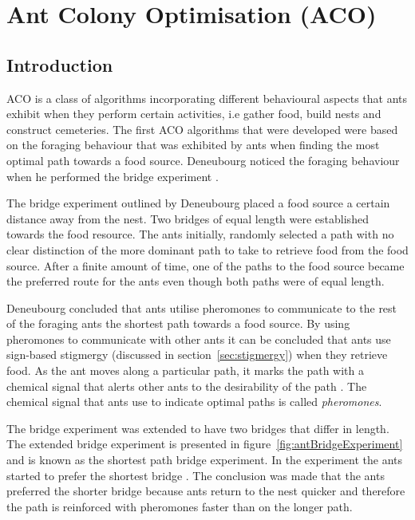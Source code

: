\section{Ant Colony Optimisation (ACO)}
\label{sec:ACO}
\subsection{Introduction}
\label{sec:ACOverview}
ACO is a class of algorithms incorporating different behavioural aspects that ants exhibit when they perform certain activities, i.e gather food, build nests and construct cemeteries\cite{AntsAndStigmergy,CompuIntelligenceIntro}. The first \gls{ACO} algorithms that were developed were based on the foraging behaviour that was exhibited by ants when finding the most optimal path towards a food source. Deneubourg noticed the foraging behaviour when he performed the bridge experiment \cite{AntsAndStigmergy,CompuIntelligenceIntro}.

The bridge experiment outlined by Deneubourg placed a food source a certain distance away from the nest\cite{AntsAndStigmergy,CompuIntelligenceIntro}. Two bridges of equal length were established towards the food resource. The ants initially, randomly selected a path with no clear distinction of the more dominant path to take to retrieve food from the food source\cite{AntsAndStigmergy,CompuIntelligenceIntro}. After a finite amount of time, one of the paths to the food source became the preferred route for the ants even though both paths were of equal length.

Deneubourg concluded that ants utilise pheromones to communicate to the rest of the foraging ants the shortest path towards a food source\cite{FundamentalSwarm}. By using pheromones to communicate with other ants it can be concluded that ants use sign-based stigmergy (discussed in section~\ref{sec:stigmergy}) when they retrieve food\cite{AntIntroTrends,AntsAndStigmergy,CompuIntelligenceIntro}. As the ant moves along a particular path, it marks the path with a chemical signal that alerts other ants to the desirability of the path \cite{CompuIntelligenceIntro}. The chemical signal that ants use to indicate optimal paths is called \emph{pheromones}\cite{AntsAndStigmergy,CompuIntelligenceIntro}.

The bridge experiment was extended to have two bridges that differ in length. The extended bridge experiment is presented in figure~\ref{fig:antBridgeExperiment} and is known as the shortest path bridge experiment\cite{FundamentalSwarm}. In the experiment the ants started to prefer the shortest bridge \cite{FundamentalSwarm}. The conclusion was made that the ants preferred the shorter bridge because ants return to the nest quicker and therefore the path is reinforced with pheromones faster than on the longer path\cite{FundamentalSwarm}.

